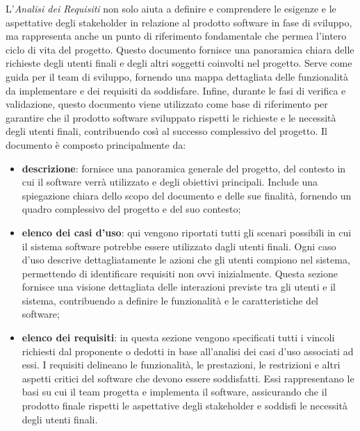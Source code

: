 L'\textit{Analisi dei Requisiti} non solo aiuta a definire e comprendere le esigenze e le aspettative degli stakeholder in relazione al prodotto software in fase di sviluppo, ma rappresenta anche un punto di riferimento fondamentale che permea l'intero ciclo di vita del progetto. Questo documento fornisce una panoramica chiara delle richieste degli utenti finali e degli altri soggetti coinvolti nel progetto. Serve come guida per il team di sviluppo, fornendo una mappa dettagliata delle funzionalità da implementare e dei requisiti da soddisfare. Infine, durante le fasi di verifica e validazione, questo documento viene utilizzato come base di riferimento per garantire che il prodotto software sviluppato rispetti le richieste e le necessità degli utenti finali, contribuendo così al successo complessivo del progetto.
Il documento è composto principalmente da:
\begin{itemize}
	\item \textbf{descrizione}: fornisce una panoramica generale del progetto, del contesto in cui il software verrà utilizzato e degli obiettivi principali. Include una spiegazione chiara dello scopo del documento e delle sue finalità, fornendo un quadro complessivo del progetto e del suo contesto;
	\item \textbf{elenco dei casi d'uso}: qui vengono riportati tutti gli scenari possibili in cui il sistema software potrebbe essere utilizzato dagli utenti finali. Ogni caso d'uso descrive dettagliatamente le azioni che gli utenti compiono nel sistema, permettendo di identificare requisiti non ovvi inizialmente. Questa sezione fornisce una visione dettagliata delle interazioni previste tra gli utenti e il sistema, contribuendo a definire le funzionalità e le caratteristiche del software;
	\item \textbf{elenco dei requisiti}: in questa sezione vengono specificati tutti i vincoli richiesti dal proponente o dedotti in base all'analisi dei casi d'uso associati ad essi. I requisiti delineano le funzionalità, le prestazioni, le restrizioni e altri aspetti critici del software che devono essere soddisfatti. Essi rappresentano le basi su cui il team progetta e implementa il software, assicurando che il prodotto finale rispetti le aspettative degli stakeholder e soddisfi le necessità degli utenti finali.
\end{itemize}

